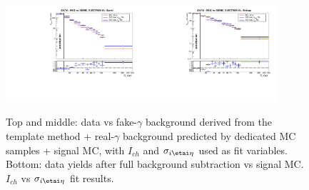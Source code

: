 \begin{figure}[htb]
\begin{center}
\includegraphics[width=0.45\textwidth]{../figs/figs_v11/ELECTRON_WGamma/PrepareYields/c_BkgSubtrDATAvsSIGMC_c_ELECTRON_WGamma__UNblind__Barrel__phoEt.pdf}\includegraphics[width=0.45\textwidth]{../figs/figs_v11/ELECTRON_WGamma/PrepareYields/c_BkgSubtrDATAvsSIGMC_c_ELECTRON_WGamma__UNblind__Endcap__phoEt.pdf}\\
  \caption{Top and middle: data vs fake-$\gamma$ background derived from the template method + real-$\gamma$ background predicted by dedicated MC samples + signal MC, with $I_{ch}$ and $\sigma_{i\etai\eta}$ used as fit variables. Bottom: data yields after full background subtraction vs signal MC. $I_{ch}$ vs $\sigma_{i\etai\eta}$ fit results. }
  \label{fig:DDvsMC_Wg_Data_ELECTRON}
  \end{center}
\end{figure}

